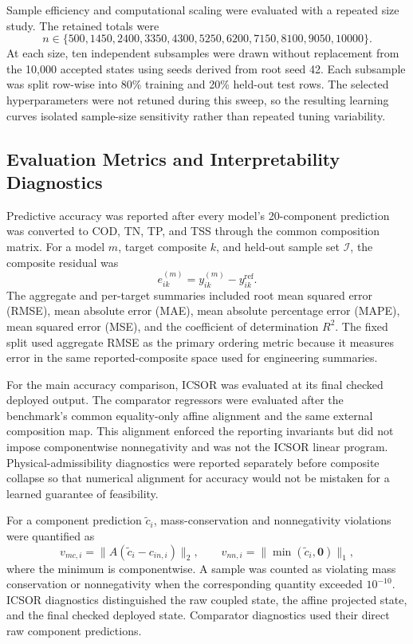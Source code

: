 \documentclass[12pt, twoside]{book}
\begin{document}
Sample efficiency and computational scaling were evaluated with a repeated size study. The retained totals
were
\begin{equation}
\label{eq:ch3_sample_sizes}
n\in\{500,1450,2400,3350,4300,5250,
6200,7150,8100,9050,10000\}.
\end{equation}
At each size, ten independent subsamples were drawn without replacement from the 10,000 accepted states using
seeds derived from root seed 42. Each subsample was split row-wise into 80\% training and 20\% held-out test
rows. The selected hyperparameters were not retuned during this sweep, so the resulting learning curves
isolated sample-size sensitivity rather than repeated tuning variability.

\subsection{Evaluation Metrics and Interpretability Diagnostics}

Predictive accuracy was reported after every model's 20-component prediction was converted to COD, TN, TP,
and TSS through the common composition matrix. For a model \(m\), target composite \(k\), and held-out sample
set \(\mathcal{I}\), the composite residual was
\begin{equation}
\label{eq:ch3_composite_residual}
e_{ik}^{(m)}=y_{ik}^{(m)}-y_{ik}^{\mathrm{ref}}.
\end{equation}
The aggregate and per-target summaries included root mean squared error (RMSE), mean absolute error (MAE),
mean absolute percentage error (MAPE), mean squared error (MSE), and the coefficient of determination
\(R^2\). The fixed split used aggregate RMSE as the primary ordering metric because it measures error in the
same reported-composite space used for engineering summaries.

For the main accuracy comparison, ICSOR was evaluated at its final checked deployed output. The comparator
regressors were evaluated after the benchmark's common equality-only affine alignment and the same external
composition map. This alignment enforced the reporting invariants but did not impose componentwise
nonnegativity and was not the ICSOR linear program. Physical-admissibility diagnostics were reported
separately before composite collapse so that numerical alignment for accuracy would not be mistaken for a
learned guarantee of feasibility.

For a component prediction \(\tilde c_i\), mass-conservation and nonnegativity violations were quantified as
\begin{equation}
\label{eq:ch3_physical_diagnostics}
v_{mc,i}=\|A(\tilde c_i-c_{in,i})\|_2,\qquad
v_{nn,i}=\|\min(\tilde c_i,\mathbf{0})\|_1,
\end{equation}
where the minimum is componentwise. A sample was counted as violating mass conservation or nonnegativity when
the corresponding quantity exceeded \(10^{-10}\). ICSOR diagnostics distinguished the raw coupled state,
the affine projected state, and the final checked deployed state. Comparator diagnostics used their direct
raw component predictions.
\end{document}
